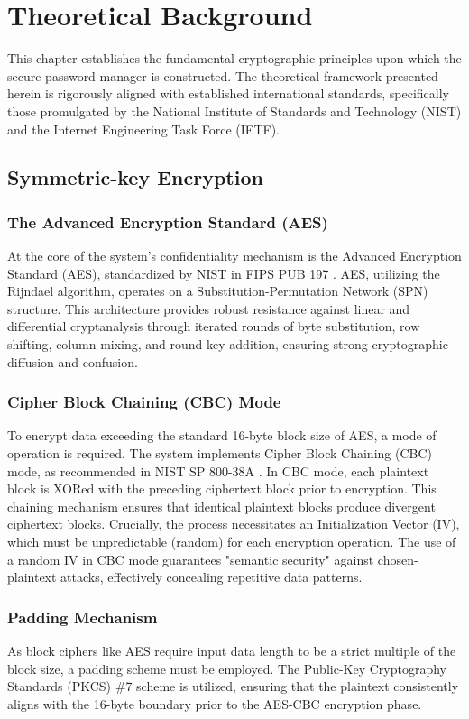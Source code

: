 \chapter{Theoretical Background}
\label{ch:theory}

This chapter establishes the fundamental cryptographic principles upon which the secure password manager is constructed. The theoretical framework presented herein is rigorously aligned with established international standards, specifically those promulgated by the National Institute of Standards and Technology (NIST) and the Internet Engineering Task Force (IETF).

\section{Symmetric-key Encryption}
\subsection{The Advanced Encryption Standard (AES)}
At the core of the system's confidentiality mechanism is the Advanced Encryption Standard (AES), standardized by NIST in FIPS PUB 197 \cite{fips197}. AES, utilizing the Rijndael algorithm, operates on a Substitution-Permutation Network (SPN) structure. This architecture provides robust resistance against linear and differential cryptanalysis through iterated rounds of byte substitution, row shifting, column mixing, and round key addition, ensuring strong cryptographic diffusion and confusion.

\subsection{Cipher Block Chaining (CBC) Mode}
To encrypt data exceeding the standard 16-byte block size of AES, a mode of operation is required. The system implements Cipher Block Chaining (CBC) mode, as recommended in NIST SP 800-38A \cite{nist80038a}. In CBC mode, each plaintext block is XORed with the preceding ciphertext block prior to encryption. This chaining mechanism ensures that identical plaintext blocks produce divergent ciphertext blocks. Crucially, the process necessitates an Initialization Vector (IV), which must be unpredictable (random) for each encryption operation. The use of a random IV in CBC mode guarantees "semantic security" against chosen-plaintext attacks, effectively concealing repetitive data patterns.

\subsection{Padding Mechanism}
As block ciphers like AES require input data length to be a strict multiple of the block size, a padding scheme must be employed. The Public-Key Cryptography Standards (PKCS) \#7 scheme is utilized, ensuring that the plaintext consistently aligns with the 16-byte boundary prior to the AES-CBC encryption phase.


